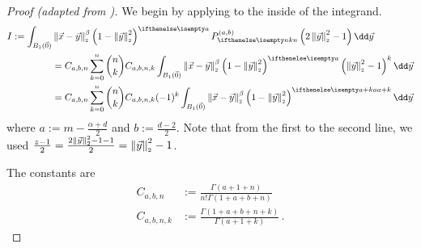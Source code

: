 \begin{proof}[Proof (adapted from \cite{2021-arbitrary-dimensions})]
  We begin by applying  to the inside of the integrand.
  \begin{align*}
    I := \int_{B_1(\vec{0})} & \norm{\vec{x}-\vec{y}}^\beta \weight{y} \jacobi[n]{y} \dd\vec{y}                                                                                             \\
                             & = C_{a,b,n} \sum_{k=0}^n \binom{n}{k} C_{a,b,n,k} \int_{B_1(\vec{0})} \norm{\vec{x}-\vec{y}}^\beta \weight{y} \left(\norm{\vec{y}}^2 - 1\right)^k \dd\vec{y} \\
                             & = C_{a,b,n} \sum_{k=0}^n \binom{n}{k} C_{a,b,n,k} (-1)^k \int_{B_1(\vec{0})} \norm{\vec{x}-\vec{y}}^\beta \weight[a+k]{y} \dd\vec{y}
  \end{align*}
  where $a := m-\frac{\alpha+d}{2}$ and $b := \frac{d-2}{2}$.
  Note that from the first to the second line, we used $\frac{z-1}{2} = \frac{2\left\lVert\vec{y}\right\rVert_{\scriptscriptstyle 2}^2-1 - 1}{2} = \left\lVert\vec{y}\right\rVert_{\scriptscriptstyle 2}^2 - 1$.

  The constants are
  \begin{align*}
    C_{a,b,n}   & := \frac{\Gamma(a+1+n)}{n! \Gamma(1+a+b+n)}     \\
    C_{a,b,n,k} & := \frac{\Gamma(1+a+b+n + k)}{\Gamma(a+1+k)}\,.
  \end{align*}


\end{proof}

